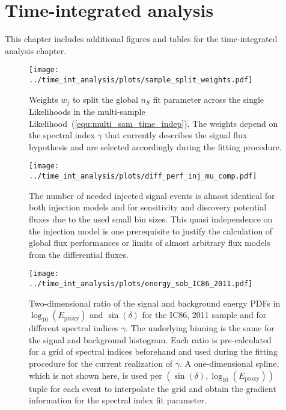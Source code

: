 \section{Time-integrated analysis}
This chapter includes additional figures and tables for the time-integrated analysis chapter.
\begin{figure}[H]
  \centering
  \texttt{[image: ../time\_int\_analysis/plots/sample\_split\_weights.pdf]}
  \caption[Signal split weights for the time-integrated analysis]{
    Weights $w_j$ to split the global $n_S$ fit parameter across the single Likelihoods in the multi-sample Likelihood~(\ref{equ:multi_sam_time_indep}).
    The weights depend on the spectral index $\gamma$ that currently describes the signal flux hypothesis and are selected accordingly during the fitting procedure.
  }
  \label{fig:sample_split_weights}
\end{figure}
\enlargethispage*{5cm}
\begin{figure}[H]
  \centering
  \texttt{[image: ../time\_int\_analysis/plots/diff\_perf\_inj\_mu\_comp.pdf]}
  \caption[Injected signal events for the time-integrated diff. performance fluxes]{
    The number of needed injected signal events is almost identical for both injection models and for sensitivity and discovery potential fluxes due to the used small bin sizes.
    This quasi independence on the injection model is one prerequisite to justify the calculation of global flux performances or limits of almost arbitrary flux models from the differential fluxes.
  }
  \label{fig:tindep_diff_perf_inj_mu_comp}
\end{figure}


\begin{figure}[H]
  \centering
  \texttt{[image: ../time\_int\_analysis/plots/energy\_sob\_IC86\_2011.pdf]}
  \caption[Energy PDF for the time-integrated analysis for IC86, 2011]{
    Two-dimensional ratio of the signal and background energy PDFs in $\log_{10}\left(E_\text{proxy}\right)$ and $\sin(\delta)$ for the IC86, 2011 sample and for different spectral indices $\gamma$.
    The underlying binning is the same for the signal and background histogram.
    Each ratio is pre-calculated for a grid of spectral indices beforehand and used during the fitting procedure for the current realization of $\gamma$.
    A one-dimensional spline, which is not shown here, is used per $\left(\sin(\delta), \log_{10}\left(E_\text{proxy}\right)\right)$ tuple for each event to interpolate the grid and obtain the gradient information for the spectral index fit parameter.
  }
  \label{fig:tindep_energy_sob_IC86_2011}
\end{figure}

